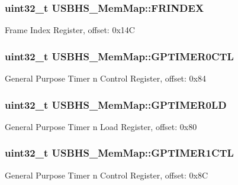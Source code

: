 \subsubsection[{F\+R\+I\+N\+D\+E\+X}]{\setlength{\rightskip}{0pt plus 5cm}uint32\+\_\+t U\+S\+B\+H\+S\+\_\+\+Mem\+Map\+::\+F\+R\+I\+N\+D\+E\+X}\label{struct_u_s_b_h_s___mem_map_a1da0dd96308b41481bf16c509d8993dc}
Frame Index Register, offset\+: 0x14\+C \hypertarget{struct_u_s_b_h_s___mem_map_a60b5ac2618429761b81716b5839c960a}{}
\subsubsection[{G\+P\+T\+I\+M\+E\+R0\+C\+T\+L}]{\setlength{\rightskip}{0pt plus 5cm}uint32\+\_\+t U\+S\+B\+H\+S\+\_\+\+Mem\+Map\+::\+G\+P\+T\+I\+M\+E\+R0\+C\+T\+L}\label{struct_u_s_b_h_s___mem_map_a60b5ac2618429761b81716b5839c960a}
General Purpose Timer n Control Register, offset\+: 0x84 \hypertarget{struct_u_s_b_h_s___mem_map_a163a112733db4f36b2efceb85179a846}{}
\subsubsection[{G\+P\+T\+I\+M\+E\+R0\+L\+D}]{\setlength{\rightskip}{0pt plus 5cm}uint32\+\_\+t U\+S\+B\+H\+S\+\_\+\+Mem\+Map\+::\+G\+P\+T\+I\+M\+E\+R0\+L\+D}\label{struct_u_s_b_h_s___mem_map_a163a112733db4f36b2efceb85179a846}
General Purpose Timer n Load Register, offset\+: 0x80 \hypertarget{struct_u_s_b_h_s___mem_map_a53cb9dae742446a00ef3a3024f8274bb}{}
\subsubsection[{G\+P\+T\+I\+M\+E\+R1\+C\+T\+L}]{\setlength{\rightskip}{0pt plus 5cm}uint32\+\_\+t U\+S\+B\+H\+S\+\_\+\+Mem\+Map\+::\+G\+P\+T\+I\+M\+E\+R1\+C\+T\+L}\label{struct_u_s_b_h_s___mem_map_a53cb9dae742446a00ef3a3024f8274bb}
General Purpose Timer n Control Register, offset\+: 0x8\+C \hypertarget{struct_u_s_b_h_s___mem_map_a1243aa3b80b401c703ae05fb205957e2}{}

